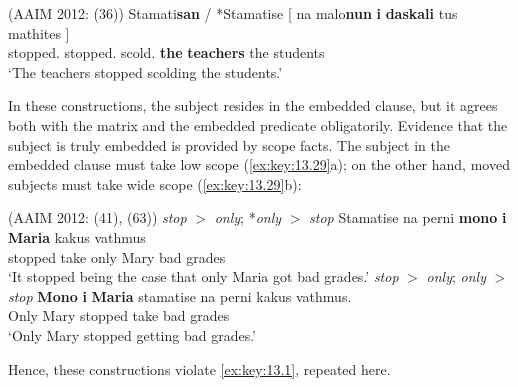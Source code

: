 \documentclass[output=paper]{langsci/langscibook}
\begin{document}
\ea%
\label{ex:key:13.28} (AAIM 2012: (36))
    \sn
    \gll  Stamati\textbf{san} / *Stamatise [ na malo\textbf{nun} \textbf{i} \textbf{daskali} tus mathites ] \\
        stopped.\textbf{\Tpl} {}  \hphantom{*}stopped.\Tsg{} {} \Sbjv{} scold.\textbf{\Tpl} \textbf{the} \textbf{teachers}  the students\\
    \glt  ‘The teachers stopped scolding the students.’
\z

In these constructions, the subject resides in the embedded clause, but it
agrees both with the matrix and the embedded predicate obligatorily. Evidence
that the subject is truly embedded is provided by scope facts. The subject in
the embedded clause must take low scope (\ref{ex:key:13.29}a); on the other hand,
moved subjects must take wide scope (\ref{ex:key:13.29}b):

\ea%
    \label{ex:key:13.29} (AAIM 2012: (41), (63))
    \sn \emph{stop} $>$ \emph{only}; *\emph{only} $>$ \emph{stop}
	\ea
	\gll  Stamatise na perni  \textbf{mono} \textbf{i} \textbf{Maria}  kakus vathmus\\
	    stopped \Sbjv{} take only   Mary bad grades\\
	\glt   ‘It stopped being the case that only Maria got bad grades.’
    \sn *\emph{stop} $>$ \emph{only}; \emph{only} $>$ \emph{stop}
	\ex
	\gll  \textbf{Mono} \textbf{i} \textbf{Maria} stamatise na perni kakus vathmus.\\
	    Only Mary stopped \Sbjv{} take bad grades\\
	\glt   ‘Only Mary stopped getting bad grades.’
    \z
\z

Hence, these constructions violate \eqref{ex:key:13.1}, repeated here.
\end{document}

